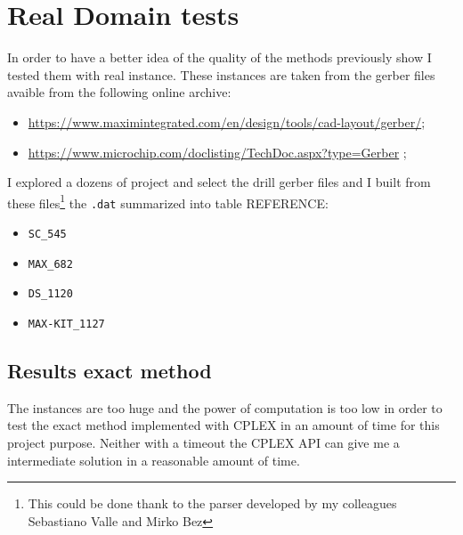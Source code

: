 \section{Real Domain tests}
\label{sec:realDomainTests}
	In order to have a better idea of the quality of the methods previously show I tested them with real instance. These instances are taken from the gerber files avaible from the following online archive:
	\begin{itemize}
		\item \href{https://www.maximintegrated.com/en/design/tools/cad-layout/gerber/}{https://www.maximintegrated.com/en/design/tools/cad-layout/gerber/};
		\item \href{https://www.microchip.com/doclisting/TechDoc.aspx?type=Gerber}{https://www.microchip.com/doclisting/TechDoc.aspx?type=Gerber} ;
	\end{itemize}

	I explored a dozens of project and select the drill gerber files and I built from these files\footnote{This could be done thank to the parser developed by my colleagues Sebastiano Valle and Mirko Bez} the \verb|.dat| summarized into table REFERENCE:
	
	\begin{itemize}
		\item \verb|SC_545|
		\item \verb|MAX_682|
		\item \verb|DS_1120|
		\item \verb|MAX-KIT_1127|
	\end{itemize}
	
	\subsection{Results exact method}
		The instances are too huge and the power of computation is too low in order to test the exact method implemented with CPLEX in an amount of time for this project purpose. Neither with a timeout the CPLEX API can give me a intermediate solution in a reasonable amount of time.
		
		
	